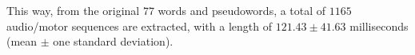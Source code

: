 This way, from the original $77$ words and pseudowords, a total
of $1165$ audio/motor sequences are extracted, with a length of $121.43 \pm 41.63$
milliseconds (mean $\pm$ one standard deviation).
%
%
%
%
%
%
